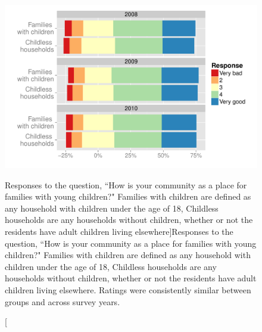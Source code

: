 \documentclass[smallextended]{svjour3}\usepackage[]{graphicx}\usepackage[]{color}
\newenvironment{knitrout}{}{} %
\begin{document}
\begin{knitrout}
\color{fgcolor}\begin{figure}

{\centering \includegraphics[width=0.99\linewidth]{figure/kidsplotOverall-1} 

}

\caption[Responses to the question, ``How is your community as a place for families with young children?" Families with children are defined as any household with children under the age of 18, Childless households are any households without children, whether or not the residents have adult children living elsewhere]{Responses to the question, ``How is your community as a place for families with young children?" Families with children are defined as any household with children under the age of 18, Childless households are any households without children, whether or not the residents have adult children living elsewhere. Ratings were consistently similar between groups and across survey years.}\label{fig:kidsplotOverall}
\end{figure}


\end{knitrout}
\end{document}
